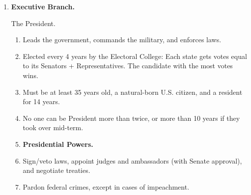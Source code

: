 \documentclass{article}
\begin{document}
\begin{multicols}{2}
\begin{enumerate}[label=\Alph*)]
\begin{enumerate}[label=1.1.\arabic*]
        \item No law may Punish actions that were legal when committed (\textit{ex post facto}).
        
        \item No law may Target individuals for punishment without trial (\textit{bill of attainder}).
        
        \item[] \textbf{Impeachment.}
        
        \item The House can accuse (impeach) any federal official of serious crimes or abuses of power. The Senate then holds a trial, with the Chief Justice presiding if the President is impeached. A 2/3 Senate vote removes the official.
        
        \item Officials removed by impeachment may not hold federal office again.
    \end{enumerate}
    
    \item \textbf{Executive Branch.}
    
    The President.
    
    \begin{enumerate}[label=1.2.\arabic*]
        \item Leads the government, commands the military, and enforces laws.
        
        \item Elected every 4 years by the Electoral College: Each state gets votes equal to its Senators + Representatives. The candidate with the most votes wins.
        
        \item Must be at least 35 years old, a natural-born U.S. citizen, and a resident for 14 years.
        
        \item No one can be President more than twice, or more than 10 years if they took over mid-term.
        
        \item[] \textbf{Presidential Powers.}
        
        \item Sign/veto laws, appoint judges and ambassadors (with Senate approval), and negotiate treaties.
        
        \item Pardon federal crimes, except in cases of impeachment.
        

\end{enumerate}
\end{enumerate}
\end{multicols}
\end{document}
